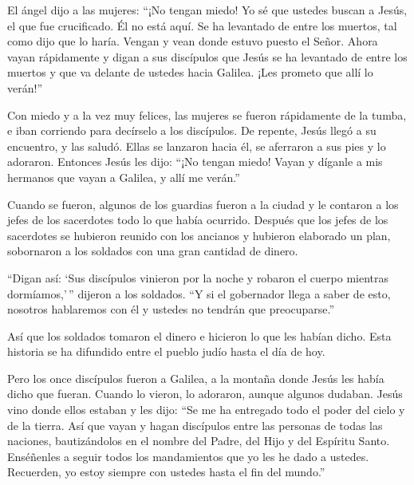  El ángel dijo a las mujeres: ``¡No tengan miedo! Yo sé que
ustedes buscan a Jesús, el que fue crucificado.  Él no está
aquí. Se ha levantado de entre los muertos, tal como dijo que lo haría.
Vengan y vean donde estuvo puesto el Señor.  Ahora vayan
rápidamente y digan a sus discípulos que Jesús se ha levantado de entre
los muertos y que va delante de ustedes hacia Galilea. ¡Les prometo que
allí lo verán!''

 Con miedo y a la vez muy felices, las mujeres se fueron
rápidamente de la tumba, e iban corriendo para decírselo a los
discípulos.  De repente, Jesús llegó a su encuentro, y las
saludó. Ellas se lanzaron hacia él, se aferraron a sus pies y lo
adoraron.  Entonces Jesús les dijo: ``¡No tengan miedo!
Vayan y díganle a mis hermanos que vayan a Galilea, y allí me verán.''

 Cuando se fueron, algunos de los guardias fueron a la
ciudad y le contaron a los jefes de los sacerdotes todo lo que había
ocurrido.  Después que los jefes de los sacerdotes se
hubieron reunido con los ancianos y hubieron elaborado un plan,
sobornaron a los soldados con una gran cantidad de dinero.

 ``Digan así: `Sus discípulos vinieron por la noche y
robaron el cuerpo mientras dormíamos,'\,'' dijeron a los soldados.
 ``Y si el gobernador llega a saber de esto, nosotros
hablaremos con él y ustedes no tendrán que preocuparse.''

 Así que los soldados tomaron el dinero e hicieron lo que
les habían dicho. Esta historia se ha difundido entre el pueblo judío
hasta el día de hoy.

 Pero los once discípulos fueron a Galilea, a la montaña
donde Jesús les había dicho que fueran.  Cuando lo vieron,
lo adoraron, aunque algunos dudaban.  Jesús vino donde
ellos estaban y les dijo: ``Se me ha entregado todo el poder del cielo y
de la tierra.  Así que vayan y hagan discípulos entre las
personas de todas las naciones, bautizándolos en el nombre del Padre,
del Hijo y del Espíritu Santo.  Enséñenles a seguir todos
los mandamientos que yo les he dado a ustedes. Recuerden, yo estoy
siempre con ustedes hasta el fin del mundo.''
